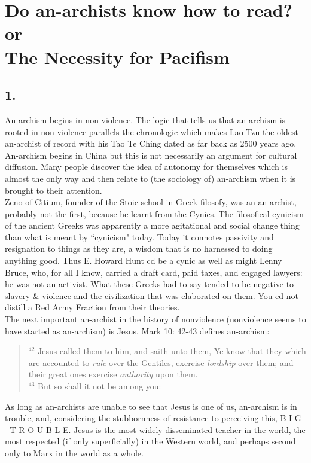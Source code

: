 \chapter[The Necessity for Pacifism]{Do an-archists know how to read? or \\The Necessity for Pacifism}

\section*{1.}
An-archism begins in non-violence. The logic that tells us that an-archism is rooted in non-violence parallels the chronologic which makes Lao-Tzu the oldest an-archist of record with his Tao Te Ching dated as far back as 2500 years ago. An-archism begins in China but this is not necessarily an argument for cultural diffusion. Many people discover the idea of autonomy for themselves which is almost the only way and then relate to (the sociology of) an-archism when it is brought to their attention.\\
Zeno of Citium, founder of the Stoic school in Greek filosofy, was an an-archist, probably not the first, because he learnt from the Cynics. The filosofical cynicism of the ancient Greeks was apparently a more agitational and social change thing than what is meant by ``cynicism" today. Today it connotes passivity and resignation to things as they are, a wisdom that is no harnessed to doing anything good. Thus E. Howard Hunt cd be a cynic as well as might Lenny Bruce, who, for all I know, carried a draft card, paid taxes, and engaged lawyers: he was not an activist. What these Greeks had to say tended to be negative to slavery \& violence and the civilization that was elaborated on them. You cd not distill a Red Army Fraction from their theories.\\
The next important an-archist in the history of nonviolence (nonviolence seems to have started as an-archism) is Jesus. Mark 10: 42-43 defines an-archism:
\blockquote{$^{42}$ Jesus called them to him, and saith unto them, Ye know that they which are accounted to \emph{rule} over the Gentiles, exercise \emph{lordship} over them; and their great ones exercise \emph{authority} upon them.\\
$^{43}$ But so shall it not be among you:}
As long as an-archists are unable to see that Jesus is one of us, an-archism is in trouble, and, considering the stubbornness of resistance to perceiving this, B I G $\;$ T R O U B L E. Jesus is the most widely disseminated teacher in the world, the most respected (if only superficially) in the Western world, and perhaps second only to Marx in the world as a whole.\\
